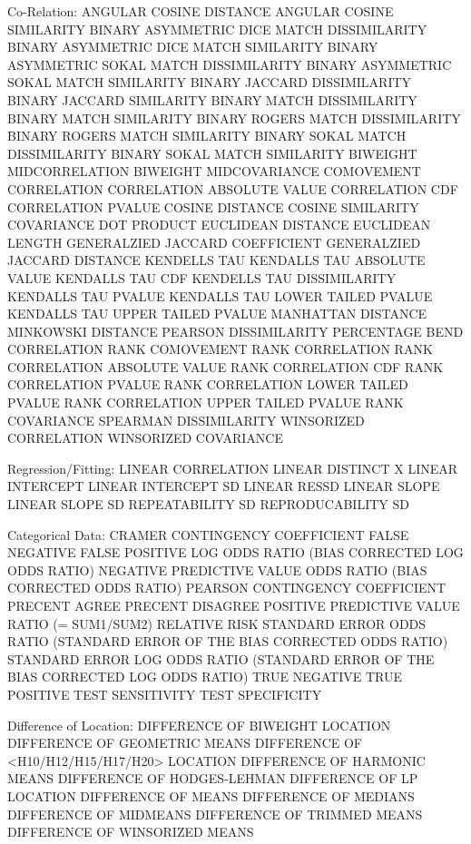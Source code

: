 Co-Relation:
   ANGULAR COSINE DISTANCE
   ANGULAR COSINE SIMILARITY
   BINARY ASYMMETRIC DICE MATCH DISSIMILARITY
   BINARY ASYMMETRIC DICE MATCH SIMILARITY
   BINARY ASYMMETRIC SOKAL MATCH DISSIMILARITY
   BINARY ASYMMETRIC SOKAL MATCH SIMILARITY
   BINARY JACCARD DISSIMILARITY
   BINARY JACCARD SIMILARITY
   BINARY MATCH DISSIMILARITY
   BINARY MATCH SIMILARITY
   BINARY ROGERS MATCH DISSIMILARITY
   BINARY ROGERS MATCH SIMILARITY
   BINARY SOKAL MATCH DISSIMILARITY
   BINARY SOKAL MATCH SIMILARITY
   BIWEIGHT MIDCORRELATION
   BIWEIGHT MIDCOVARIANCE
   COMOVEMENT
   CORRELATION
   CORRELATION ABSOLUTE VALUE
   CORRELATION CDF
   CORRELATION PVALUE
   COSINE DISTANCE
   COSINE SIMILARITY
   COVARIANCE
   DOT PRODUCT
   EUCLIDEAN DISTANCE
   EUCLIDEAN LENGTH
   GENERALZIED JACCARD COEFFICIENT
   GENERALZIED JACCARD DISTANCE
   KENDELLS TAU
   KENDALLS TAU ABSOLUTE VALUE
   KENDALLS TAU CDF
   KENDELLS TAU DISSIMILARITY
   KENDALLS TAU PVALUE
   KENDALLS TAU LOWER TAILED PVALUE
   KENDALLS TAU UPPER TAILED PVALUE
   MANHATTAN DISTANCE
   MINKOWSKI DISTANCE
   PEARSON DISSIMILARITY
   PERCENTAGE BEND CORRELATION
   RANK COMOVEMENT
   RANK CORRELATION
   RANK CORRELATION ABSOLUTE VALUE
   RANK CORRELATION CDF
   RANK CORRELATION PVALUE
   RANK CORRELATION LOWER TAILED PVALUE
   RANK CORRELATION UPPER TAILED PVALUE
   RANK COVARIANCE
   SPEARMAN DISSIMILARITY
   WINSORIZED CORRELATION
   WINSORIZED COVARIANCE

Regression/Fitting:
   LINEAR CORRELATION
   LINEAR DISTINCT X
   LINEAR INTERCEPT
   LINEAR INTERCEPT SD
   LINEAR RESSD
   LINEAR SLOPE
   LINEAR SLOPE SD
   REPEATABILITY SD
   REPRODUCABILITY SD

Categorical Data:
   CRAMER CONTINGENCY COEFFICIENT
   FALSE NEGATIVE
   FALSE POSITIVE
   LOG ODDS RATIO (BIAS CORRECTED LOG ODDS RATIO)
   NEGATIVE PREDICTIVE VALUE
   ODDS RATIO (BIAS CORRECTED ODDS RATIO)
   PEARSON CONTINGENCY COEFFICIENT
   PRECENT AGREE
   PRECENT DISAGREE
   POSITIVE PREDICTIVE VALUE
   RATIO (= SUM1/SUM2)
   RELATIVE RISK
   STANDARD ERROR ODDS RATIO (STANDARD ERROR OF THE
            BIAS CORRECTED ODDS RATIO)
   STANDARD ERROR LOG ODDS RATIO (STANDARD ERROR OF
            THE BIAS CORRECTED LOG ODDS RATIO)
   TRUE NEGATIVE
   TRUE POSITIVE
   TEST SENSITIVITY
   TEST SPECIFICITY

Difference of Location:
   DIFFERENCE OF BIWEIGHT LOCATION
   DIFFERENCE OF GEOMETRIC MEANS
   DIFFERENCE OF <H10/H12/H15/H17/H20> LOCATION
   DIFFERENCE OF HARMONIC MEANS
   DIFFERENCE OF HODGES-LEHMAN
   DIFFERENCE OF LP LOCATION
   DIFFERENCE OF MEANS
   DIFFERENCE OF MEDIANS
   DIFFERENCE OF MIDMEANS
   DIFFERENCE OF TRIMMED MEANS
   DIFFERENCE OF WINSORIZED MEANS


